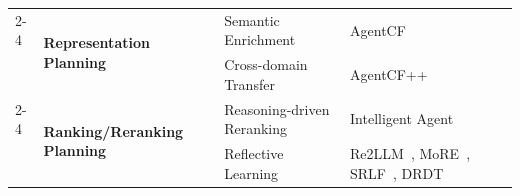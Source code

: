 \begin{table}[!t]
{\begin{tabular}{p{2.5cm} p{3cm} p{3.5cm} p{5cm} p{5cm}}
\cmidrule{2-4}

& \multirow{2}{=}{\textbf{Representation} \newline \textbf{Planning}}
& Semantic Enrichment
& AgentCF~\cite{zhang2023agentcf}
& \\

& & Cross-domain Transfer
& AgentCF++~\cite{liu2025agentcf++}
& \\[4pt]

\cmidrule{2-4}

& \multirow{2}{=}{\textbf{Ranking/Reranking} \newline \textbf{Planning}}
& Reasoning-driven Reranking
& Intelligent Agent~\cite{yu2025intelligent_agent}
& \\

& & Reflective Learning
& Re2LLM~\cite{re2llm}, MoRE~\cite{more}, SRLF~\cite{srlf}, DRDT~\cite{drdt}
& \\

\bottomrule
\end{tabular}
}
\end{table}